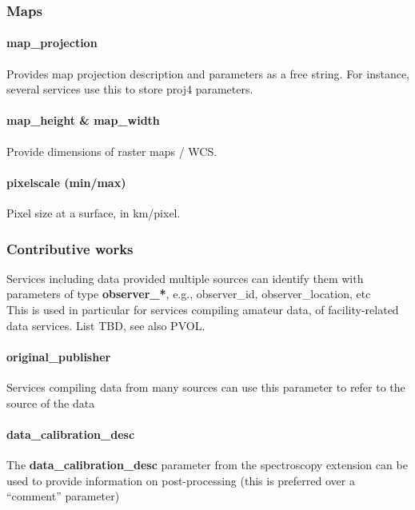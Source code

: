 \documentclass[11pt,a4paper]{ivoa}
\begin{document}
\subsubsection{Maps\\}

\paragraph{map\_projection}

Provides map projection description and parameters as a free string. For instance, several services use this to store proj4 parameters. 

\paragraph{map\_height \& map\_width}

Provide dimensions of raster maps / WCS.

\paragraph{pixelscale (min/max)}

Pixel size at a surface, in km/pixel.

\subsubsection{Contributive works\\}

Services\textbf{ }including data provided multiple sources can identify them with parameters of type \textbf{observer\_*}, e.g., observer\_id, observer\_location, etc\\This is used in particular for services compiling amateur data, of facility-related data services. List TBD, see also PVOL.

\paragraph{original\_publisher}

Services compiling data from many sources can use this\textbf{ }parameter to refer to the source of the data

\paragraph{data\_calibration\_desc}

The\textbf{ \textbf{data\_calibration\_desc}} parameter from the spectroscopy extension can be used to provide information on post-processing (this is preferred over a ``comment'' parameter)
\end{document}
